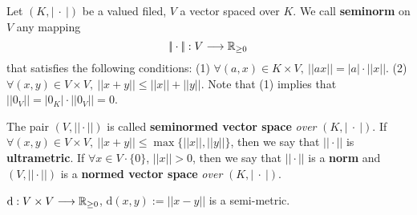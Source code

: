 \begin{definitionenv}
    Let $(K,\left|\ \cdot \ \right|)$ be a valued filed, $V$ a vector spaced over $K$. We call \textbf{seminorm} on $V$ any mapping 
    $$|\!| \cdot |\!|:V\longrightarrow \mathbb{R}_{\geq 0}$$ 
    that satisfies the following conditions:
    \newline
    (1) $\forall (a,x)\in K\times V,\ |\!|ax|\!|=|a|\cdot|\!|x|\!|$.
    \newline
    (2) $\forall (x,y)\in V\times V,\ |\!|x+y|\!|\le |\!|x|\!|+|\!|y|\!|.$
    \newline
    Note that (1) implies that $|\!|0_V|\!|=|0_K|\cdot|\!|0_V|\!|=0$.

    The pair $(V,|\!| \cdot |\!|)$ is called \textbf{seminormed vector space} \textit{over} $(K,\left|\ \cdot\ \right|)$. If $\forall(x,y)\in V\times V,\ |\!|x+y|\!|\le \max\{|\!|x|\!|,|\!|y|\!|\}$, then we say that $|\!|\cdot|\!|$ is \textbf{ultrametric}. If $\forall x\in V\cdot\{0\}$, $|\!|x|\!|>0$, then we say that $|\!| \cdot|\!|$ is a \textbf{norm} and $(V,|\!| \cdot |\!|)$ is a \textbf{normed vector space} \textit{over} $(K,\left|\ \cdot\ \right|)$.
\end{definitionenv}
\begin{exampleenv}
    $\mathrm{d}:V\times V\longrightarrow \mathbb{R}_{\ge 0}$, $\mathrm{d}(x,y):=|\!|x-y|\!|$ is a semi-metric. 
\end{exampleenv}
